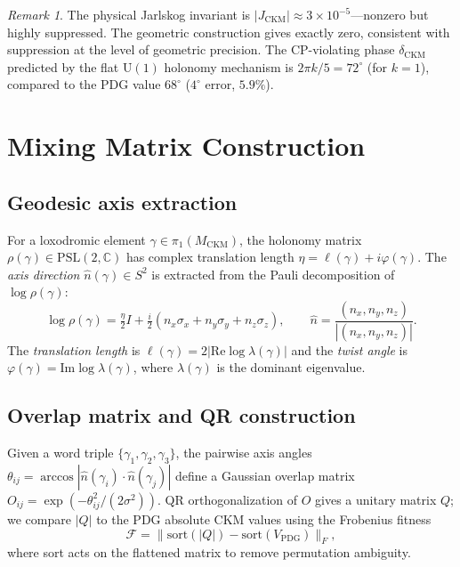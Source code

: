 \documentclass[11pt,a4paper]{article}
\theoremstyle{definition}
\theoremstyle{remark}
\newtheorem{remark}[theorem]{Remark}
\newcommand{\MCKM}{M_{\mathrm{CKM}}}
\newcommand{\PSL}{\mathrm{PSL}(2,\mathbb{C})}
\begin{document}
\begin{remark}
The physical Jarlskog invariant is $|J_{\mathrm{CKM}}|
\approx 3\times10^{-5}$---nonzero but highly suppressed.
The geometric construction gives exactly zero, consistent with
suppression at the level of geometric precision.
The CP-violating phase $\delta_{\mathrm{CKM}}$ predicted by the
flat $\mathrm{U}(1)$ holonomy mechanism is
$2\pi k/5 = 72^\circ$ (for $k=1$), compared to the PDG value
$68^\circ$ ($4^\circ$ error, $5.9\%$).
\end{remark}

\section{Mixing Matrix Construction}
\label{sec:mixing}

\subsection{Geodesic axis extraction}

For a loxodromic element $\gamma \in \pi_1(\MCKM)$, the holonomy
matrix $\rho(\gamma) \in \PSL$ has complex translation length
$\eta = \ell(\gamma) + i\varphi(\gamma)$.
The \emph{axis direction} $\hat{n}(\gamma) \in S^2$ is extracted
from the Pauli decomposition of $\log\rho(\gamma)$:
\[
  \log\rho(\gamma)
  = \tfrac{\eta}{2} I
  + \tfrac{i}{2}(n_x \sigma_x + n_y \sigma_y + n_z \sigma_z),
  \qquad
  \hat{n} = \frac{(n_x,n_y,n_z)}{|(n_x,n_y,n_z)|}.
\]
The \emph{translation length} is $\ell(\gamma)=2|\mathrm{Re}
\log\lambda(\gamma)|$ and the \emph{twist angle} is
$\varphi(\gamma)=\mathrm{Im}\log\lambda(\gamma)$, where
$\lambda(\gamma)$ is the dominant eigenvalue.

\subsection{Overlap matrix and QR construction}

Given a word triple $\{\gamma_1,\gamma_2,\gamma_3\}$, the pairwise
axis angles $\theta_{ij}=\arccos|\hat{n}(\gamma_i)\cdot
\hat{n}(\gamma_j)|$ define a Gaussian overlap matrix
$O_{ij}=\exp(-\theta_{ij}^2/(2\sigma^2))$. QR orthogonalization
of $O$ gives a unitary matrix $Q$; we compare $|Q|$ to the
PDG absolute CKM values using the Frobenius fitness
\[
  \mathcal{F} = \bigl\| \mathrm{sort}(|Q|) - \mathrm{sort}(V_{\mathrm{PDG}}) \bigr\|_F,
\]
where sort acts on the flattened matrix to remove permutation
ambiguity.
\end{document}
